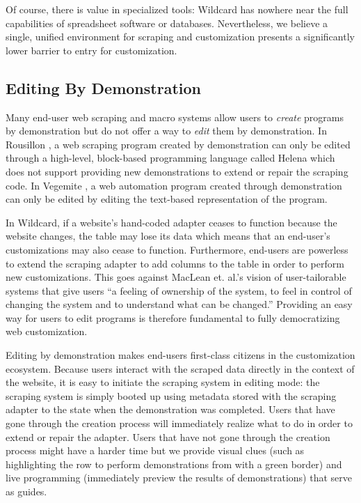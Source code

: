 \documentclass[sigconf,10pt]{acmart}
\begin{document}
Of course, there is value in specialized tools: Wildcard has nowhere
near the full capabilities of spreadsheet software or databases.
Nevertheless, we believe a single, unified environment for scraping and
customization presents a significantly lower barrier to entry for
customization.

\hypertarget{editing-by-demonstration-1}{%
\subsection{Editing By Demonstration}\label{editing-by-demonstration-1}}

Many end-user web scraping and macro systems allow users to
\emph{create} programs by demonstration but do not offer a way to
\emph{edit} them by demonstration. In Rousillon \citep{chasins2018}, a
web scraping program created by demonstration can only be edited through
a high-level, block-based programming language called Helena
\citep{zotero-51} which does not support providing new demonstrations to
extend or repair the scraping code. In Vegemite \citep{lin2009}, a web
automation program created through demonstration can only be edited by
editing the text-based representation of the program.

In Wildcard, if a website's hand-coded adapter ceases to function
because the website changes, the table may lose its data which means
that an end-user's customizations may also cease to function.
Furthermore, end-users are powerless to extend the scraping adapter to
add columns to the table in order to perform new customizations. This
goes against MacLean et. al.'s vision of user-tailorable systems
\citep{maclean1990} that give users ``a feeling of ownership of the
system, to feel in control of changing the system and to understand what
can be changed.'' Providing an easy way for users to edit programs is
therefore fundamental to fully democratizing web customization.

Editing by demonstration makes end-users first-class citizens in the
customization ecosystem. Because users interact with the scraped data
directly in the context of the website, it is easy to initiate the
scraping system in editing mode: the scraping system is simply booted up
using metadata stored with the scraping adapter to the state when the
demonstration was completed. Users that have gone through the creation
process will immediately realize what to do in order to extend or repair
the adapter. Users that have not gone through the creation process might
have a harder time but we provide visual clues (such as highlighting the
row to perform demonstrations from with a green border) and live
programming (immediately preview the results of demonstrations) that
serve as guides.
\end{document}
